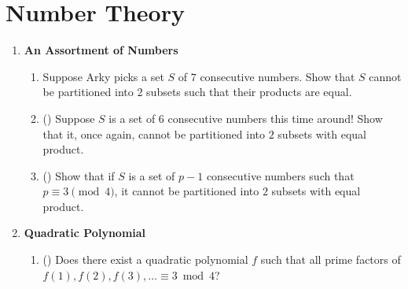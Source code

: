 \documentclass[11pt]{scrartcl}
\begin{document}
\section{Number Theory}
\begin{enumerate}[label=\textbf{N\arabic*}.]
    \item \textbf{An Assortment of Numbers}
    \begin{enumerate}
        \item Suppose Arky picks a set $S$ of $7$ consecutive numbers. Show that $S$ cannot be partitioned into $2$ subsets such that their products are equal.
        
        \item (\halfchili) Suppose $S$ is a set of $6$ consecutive numbers this time around! Show that it, once again, cannot be partitioned into $2$ subsets with equal product.
        
        \item (\fullchili) Show that if $S$ is a set of $p-1$ consecutive numbers such that $p \equiv 3 \pmod{4}$, it cannot be partitioned into $2$ subsets with equal product.
    \end{enumerate}

    \item \textbf{Quadratic Polynomial}
    \begin{enumerate}
        \item (\fullchili) Does there exist a quadratic polynomial $f$ such that all prime factors of $f(1), f(2), f(3), \dots \equiv 3 \bmod{4}$?
    \end{enumerate}
\end{enumerate}
\end{document}
